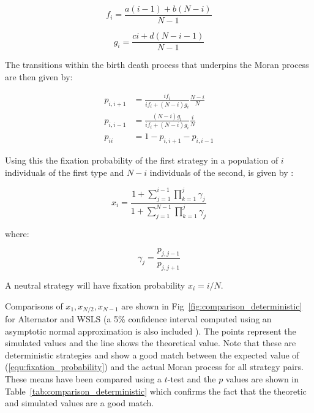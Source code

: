 \documentclass[10pt,letterpaper]{article}
\begin{document}
\begin{equation}\label{equ:expected_payoff_one}
    f_i = \frac{a(i - 1) + b(N - i)}{N - 1}
\end{equation}

\begin{equation}\label{equ:expected_payoff_two}
    g_i = \frac{ci + d(N - i - 1)}{N - 1}
\end{equation}

The transitions within the birth death process that underpins the Moran process
are then given by:

\begin{align}
    p_{i, i+1}&= \frac{if_i}{if_i+(N-i)g_i}\frac{N-i}{N}\label{equ:p_up}\\
    p_{i, i-1}&= \frac{(N-i)g_i}{if_i+(N-i)g_i}\frac{i}{N}\label{equ:p_down}\\
    p_{ii} &= 1 - p_{i, i+1} - p_{i, i-1}\label{equ:p_stay}
\end{align}

Using this the fixation probability
of the first strategy in a population of \(i\) individuals of the first type
and \(N-i\) individuals of the second, is given by \cite{Nowak2017}:

\begin{equation}\label{equ:fixation_probability}
x_i = \frac{1 + \sum_{j=1}^{i-1}\prod_{k=1}^{j}\gamma_j}{1 + \sum_{j=1}^{N-1}
      \prod_{k=1}^{j}\gamma_j}
\end{equation}

where:

\[
\gamma_j = \frac{p_{j, j-1}}{p_{j, j+1}}
\]

A neutral strategy will have fixation probability $x_i = i/N$.

Comparisons of \(x_1, x_{N/2}, x_{N-1}\) are shown in
Fig~\ref{fig:comparison_deterministic} for Alternator and WSLS (a 5\%
confidence interval computed using an asymptotic normal approximation is also
included \cite{brown2001interval}).
The points represent the simulated
values and the line shows the theoretical value. Note that these are
deterministic strategies and show a good match between the expected value
of (\ref{equ:fixation_probability}) and the actual Moran process for all
strategy pairs. These means have been compared using a \(t\)-test and the \(p\)
values are shown in Table~\ref{tab:comparison_deterministic} which confirms the
fact that the theoretic and simulated values are a good match.
\end{document}
